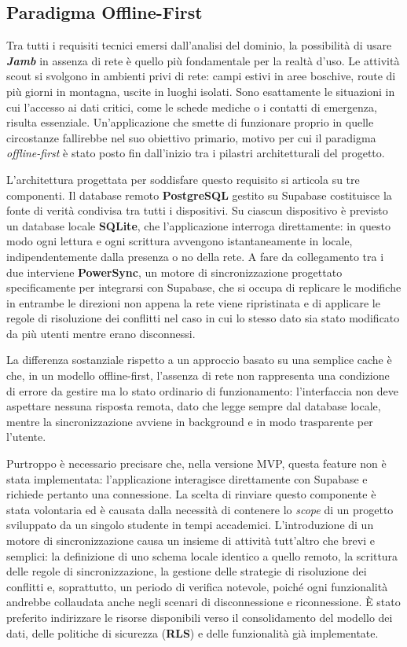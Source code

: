 \documentclass[11pt]{article}
\numberwithin{figure}{section}
\begin{document}
\subsection{Paradigma Offline-First}

Tra tutti i requisiti tecnici emersi dall'analisi del dominio, la possibilità di usare \textbf{\textit{Jamb}} in assenza di rete è quello più fondamentale per la realtà d'uso. Le attività scout si svolgono in ambienti privi di rete: campi estivi in aree boschive, route di più giorni in montagna, uscite in luoghi isolati. Sono esattamente le situazioni in cui l'accesso ai dati critici, come le schede mediche o i contatti di emergenza, risulta essenziale. Un'applicazione che smette di funzionare proprio in quelle circostanze fallirebbe nel suo obiettivo primario, motivo per cui il paradigma \textit{offline-first} è stato posto fin dall'inizio tra i pilastri architetturali del progetto.

L'architettura progettata per soddisfare questo requisito si articola su tre componenti. Il database remoto \textbf{PostgreSQL} gestito su Supabase costituisce la fonte di verità condivisa tra tutti i dispositivi. Su ciascun dispositivo è previsto un database locale \textbf{SQLite}, che l'applicazione interroga direttamente: in questo modo ogni lettura e ogni scrittura avvengono istantaneamente in locale, indipendentemente dalla presenza o no della rete. A fare da collegamento tra i due interviene \textbf{PowerSync}, un motore di sincronizzazione progettato specificamente per integrarsi con Supabase, che si occupa di replicare le modifiche in entrambe le direzioni non appena la rete viene ripristinata e di applicare le regole di risoluzione dei conflitti nel caso in cui lo stesso dato sia stato modificato da più utenti mentre erano disconnessi.

La differenza sostanziale rispetto a un approccio basato su una semplice cache è che, in un modello offline-first, l'assenza di rete non rappresenta una condizione di errore da gestire ma lo stato ordinario di funzionamento: l'interfaccia non deve aspettare nessuna risposta remota, dato che legge sempre dal database locale, mentre la sincronizzazione avviene in background e in modo trasparente per l'utente.


Purtroppo è necessario precisare che, nella versione MVP, questa feature non è stata implementata: l'applicazione interagisce direttamente con Supabase e richiede pertanto una connessione. La scelta di rinviare questo componente è stata volontaria ed è causata dalla necessità di contenere lo \textit{scope} di un progetto sviluppato da un singolo studente in tempi accademici. L'introduzione di un motore di sincronizzazione causa un insieme di attività tutt'altro che brevi e semplici: la definizione di uno schema locale identico a quello remoto, la scrittura delle regole di sincronizzazione, la gestione delle strategie di risoluzione dei conflitti e, soprattutto, un periodo di verifica notevole, poiché ogni funzionalità andrebbe collaudata anche negli scenari di disconnessione e riconnessione. È stato preferito indirizzare le risorse disponibili verso il consolidamento del modello dei dati, delle politiche di sicurezza (\textbf{RLS}) e delle funzionalità già implementate.
\end{document}
